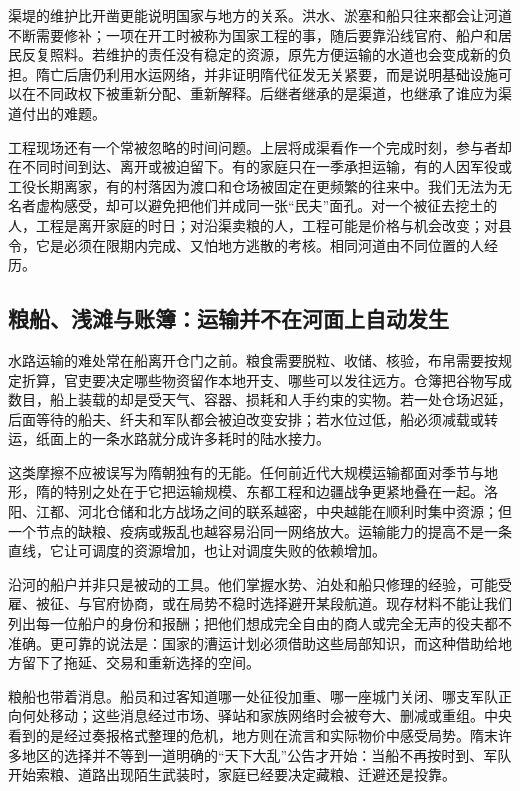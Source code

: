 渠堤的维护比开凿更能说明国家与地方的关系。洪水、淤塞和船只往来都会让河道不断需要修补；一项在开工时被称为国家工程的事，随后要靠沿线官府、船户和居民反复照料。若维护的责任没有稳定的资源，原先方便运输的水道也会变成新的负担。隋亡后唐仍利用水运网络，并非证明隋代征发无关紧要，而是说明基础设施可以在不同政权下被重新分配、重新解释。后继者继承的是渠道，也继承了谁应为渠道付出的难题。

工程现场还有一个常被忽略的时间问题。上层将成渠看作一个完成时刻，参与者却在不同时间到达、离开或被迫留下。有的家庭只在一季承担运输，有的人因军役或工役长期离家，有的村落因为渡口和仓场被固定在更频繁的往来中。我们无法为无名者虚构感受，却可以避免把他们并成同一张“民夫”面孔。对一个被征去挖土的人，工程是离开家庭的时日；对沿渠卖粮的人，工程可能是价格与机会改变；对县令，它是必须在限期内完成、又怕地方逃散的考核。相同河道由不同位置的人经历。

\subsection{粮船、浅滩与账簿：运输并不在河面上自动发生}
水路运输的难处常在船离开仓门之前。粮食需要脱粒、收储、核验，布帛需要按规定折算，官吏要决定哪些物资留作本地开支、哪些可以发往远方。仓簿把谷物写成数目，船上装载的却是受天气、容器、损耗和人手约束的实物。若一处仓场迟延，后面等待的船夫、纤夫和军队都会被迫改变安排；若水位过低，船必须减载或转运，纸面上的一条水路就分成许多耗时的陆水接力。

这类摩擦不应被误写为隋朝独有的无能。任何前近代大规模运输都面对季节与地形，隋的特别之处在于它把运输规模、东都工程和边疆战争更紧地叠在一起。洛阳、江都、河北仓储和北方战场之间的联系越密，中央越能在顺利时集中资源；但一个节点的缺粮、疫病或叛乱也越容易沿同一网络放大。运输能力的提高不是一条直线，它让可调度的资源增加，也让对调度失败的依赖增加。

沿河的船户并非只是被动的工具。他们掌握水势、泊处和船只修理的经验，可能受雇、被征、与官府协商，或在局势不稳时选择避开某段航道。现存材料不能让我们列出每一位船户的身份和报酬；把他们想成完全自由的商人或完全无声的役夫都不准确。更可靠的说法是：国家的漕运计划必须借助这些局部知识，而这种借助给地方留下了拖延、交易和重新选择的空间。

粮船也带着消息。船员和过客知道哪一处征役加重、哪一座城门关闭、哪支军队正向何处移动；这些消息经过市场、驿站和家族网络时会被夸大、删减或重组。中央看到的是经过奏报格式整理的危机，地方则在流言和实际物价中感受局势。隋末许多地区的选择并不等到一道明确的“天下大乱”公告才开始：当船不再按时到、军队开始索粮、道路出现陌生武装时，家庭已经要决定藏粮、迁避还是投靠。

